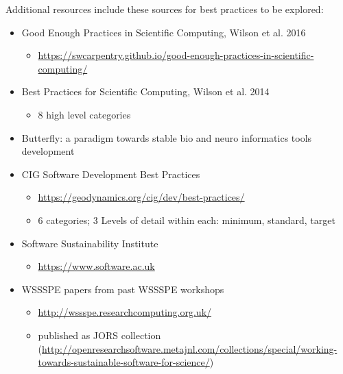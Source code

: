 \noindent
Additional resources include these sources for best practices to be explored:

\begin{itemize}

\item Good Enough Practices in Scientific Computing, Wilson et al. 2016~\cite{DBLP:journals/corr/WilsonBCKNT16}
\begin{itemize}
\item \url{https://swcarpentry.github.io/good-enough-practices-in-scientific-computing/}
\end{itemize}

\item Best Practices for Scientific Computing, Wilson et al. 2014~\cite{bestprSC}
\begin{itemize}
\item 8 high level categories
\end{itemize}

\item Butterfly: a paradigm towards stable bio and neuro informatics tools development~\cite{10.3389/conf.fnins.2015.91.00009}


\item CIG Software Development Best Practices
\begin{itemize}
\item \url{https://geodynamics.org/cig/dev/best-practices/}
\item 6 categories; 3 Levels of detail within each: minimum, standard, target
\end{itemize}


\item Software Sustainability Institute
\begin{itemize}
\item \url{https://www.software.ac.uk}
\end{itemize}

\item WSSSPE papers from past WSSSPE workshops
\begin{itemize}
\item \url{http://wssspe.researchcomputing.org.uk/}
\item published as JORS collection (\url{http://openresearchsoftware.metajnl.com/collections/special/working-towards-sustainable-software-for-science/})
\end{itemize}


\end{itemize}
